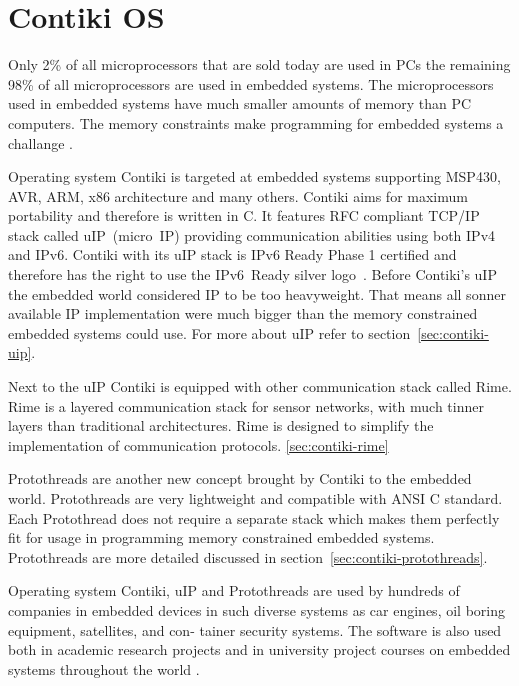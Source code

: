 
\chapter{Contiki OS}
Only 2\% of all microprocessors that are sold today are used in PCs the remaining 98\%
of all microprocessors are used in embedded systems. The microprocessors
used in embedded systems have much smaller amounts of memory than PC computers.
The memory constraints make programming for embedded systems a challange \cite{thesis-programming}.

Operating system Contiki is targeted at embedded systems supporting MSP430, AVR, ARM, x86 architecture and many others.
Contiki aims for maximum portability and therefore is written in C. It features RFC compliant TCP/IP stack called uIP~(micro~IP)
providing communication abilities using both IPv4 and IPv6\cite{contiki-docs}. Contiki with its uIP stack is IPv6 Ready Phase 1 certified
and therefore has the right to use the IPv6~Ready silver logo~\cite{ipv6ready-db}. Before Contiki's uIP the embedded world considered IP to be too
heavyweight. That means all sonner available IP implementation were much bigger than the memory constrained embedded systems
could use. For more about uIP refer to section~\ref{sec:contiki-uip}.

Next to the uIP Contiki is equipped with other communication stack called Rime.
Rime is a layered communication stack for sensor networks,
with much tinner layers than traditional architectures.
Rime is designed to simplify the implementation of communication
protocols. \ref{sec:contiki-rime}
\!

Protothreads are another new concept brought by Contiki to the embedded world.
Protothreads are very lightweight and compatible with ANSI C standard.
Each Protothread does not require a separate stack which makes them perfectly
fit for usage in programming memory constrained embedded systems.
Protothreads are more detailed discussed in section~\ref{sec:contiki-protothreads}.

Operating system Contiki, uIP and Protothreads are used by hundreds of companies in embedded devices in
such diverse systems as car engines, oil boring equipment, satellites, and con-
tainer security systems. The software is also used both in academic research
projects and in university project courses on embedded systems throughout the
world \cite{thesis-programming}.

